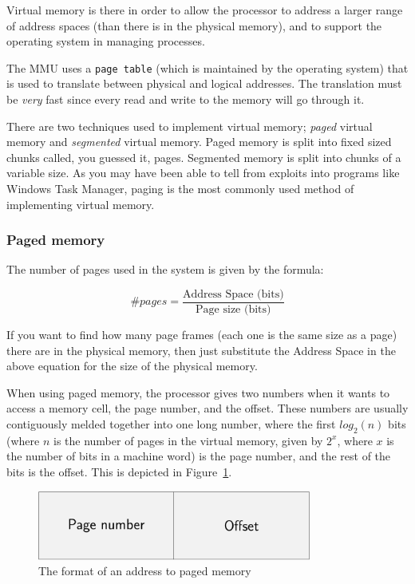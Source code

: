 Virtual memory is there in order to allow the processor to address a larger
range of address spaces (than there is in the physical memory), and to support
the operating system in managing processes.

The MMU uses a \texttt{page table} (which is maintained by the operating system)
that is used to translate between physical and logical addresses. The
translation must be \textit{very} fast since every read and write to the memory
will go through it.

There are two techniques used to implement virtual memory; \textit{paged}
virtual memory and \textit{segmented} virtual memory. Paged memory is split into
fixed sized chunks called, you guessed it, pages. Segmented memory is split into
chunks of a variable size. As you may have been able to tell from exploits into
programs like Windows Task Manager, paging is the most commonly used method of
implementing virtual memory.

\subsubsection{Paged memory}

The number of pages used in the system is given by the formula:

\[
	\#pages = \frac{\text{Address Space (bits)}}{\text{Page size (bits)}}
\]

If you want to find how many page frames (each one is the same size as a page)
there are in the physical memory, then just substitute the Address Space in the
above equation for the size of the physical memory.

When using paged memory, the processor gives two numbers when it wants to access
a memory cell, the page number, and the offset. These numbers are usually
contiguously melded together into one long number, where the first $log_2(n)$
bits (where $n$ is the number of pages in the virtual memory, given by $2^x$,
where $x$ is the number of bits in a machine word) is the page number, and the
rest of the bits is the offset. This is depicted in Figure~\ref{memory-address}.

\begin{figure}[ht!]
  \centering
  \includegraphics[width=90mm]{diagrams/memory-address.pdf}
  \caption{The format of an address to paged memory}
  \label{memory-address}
\end{figure}

